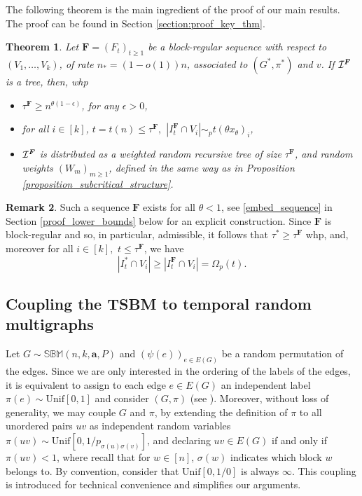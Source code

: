 \documentclass[11pt]{article}
\numberwithin{equation}{section}
\newtheorem{theorem}{Theorem}[section]
\theoremstyle{definition}
\newtheorem{remark}[theorem]{Remark}
\newcommand\bB{{\mathbb B}}
\newcommand\bM{{\mathbb M}}
\newcommand\bS{{\mathbb S}}
\newcommand\cI{{\cal{I}}}
\begin{document}
The following theorem is the main ingredient of the proof of our main results. The proof can be found in Section \ref{section:proof_key_thm}.

\begin{theorem}
\label{key:theorem}
Let $\boldsymbol{F}=(F_t)_{t\geq 1}$ be a block-regular sequence with respect to $(V_1,\ldots,V_k)$, of rate $n_* = (1-o(1))n$, associated to $(G^*,\pi^*)$ and $v$. If $\cI^{\boldsymbol{F}}$ is a tree, then, whp
\begin{itemize}
	\item $\tau^{\boldsymbol{F}} \geq n^{\theta(1-\epsilon)}$, for any $\epsilon > 0$,
	\item for all $i\in [k]$, $t = t(n) \leq  \tau^{\boldsymbol{F}},$ $|I^{\boldsymbol{F}}_t\cap V_i|\sim_p t(\theta x_\theta)_i$,
	\item $\cI^{\boldsymbol{F}}$ is distributed as a weighted random recursive tree of size $\tau^{\boldsymbol{F}}$, and random weights $(W_m)_{m\geq 1}$, defined in the same way as in Proposition \ref{proposition_subcritical_structure}.
\end{itemize}
\end{theorem}

\begin{remark}\label{remark:preliminary_lower_bounds} Such a sequence $\boldsymbol{F}$ exists for all $\theta < 1$, see \eqref{embed_sequence} in Section \ref{proof_lower_bounds} below for an explicit construction. Since $\boldsymbol{F}$ is block-regular and so, in particular, admissible, it follows that $\tau^* \geq \tau^{\boldsymbol{F}}$ whp, and, moreover for all $i \in [k],$ $t\leq \tau^{\boldsymbol{F}}$, we have 
$$|I^*_t \cap V_i| \geq |I^{\boldsymbol{F}}_t \cap V_i| = \Omega_p(t).$$
\end{remark}

\subsection{Coupling the TSBM to temporal random multigraphs}
\label{subsection_multi}

Let $G \sim \bS\bB\bM(n,k,\boldsymbol{a},P)$ and $(\psi(e))_{e\in E(G)}$ be a random permutation of the edges. Since we are only interested in the ordering of the labels of the edges, it is equivalent to assign to each edge $e \in E(G)$ an independent label $\pi(e) \sim \mathrm{Unif}[0,1]$ and consider $(G,\pi)$ (see \cite{CRRZ24}). Moreover, without loss of generality, we may couple $G$ and $\pi$, by extending the definition of $\pi$ to all unordered pairs $uv$ as independent random variables $\pi(uv) \sim \textrm{Unif}[0,1/p_{\sigma(u)\sigma(v)}]$, and declaring $uv \in E(G)$ if and only if $\pi(uv) < 1$, where recall that for $w\in [n]$, $\sigma(w)$ indicates which block $w$ belongs to. By convention, consider that $\textrm{Unif}[0,1/0]$ is always $\infty$. This coupling is introduced for technical convenience and simplifies our arguments. \\
\end{document}
